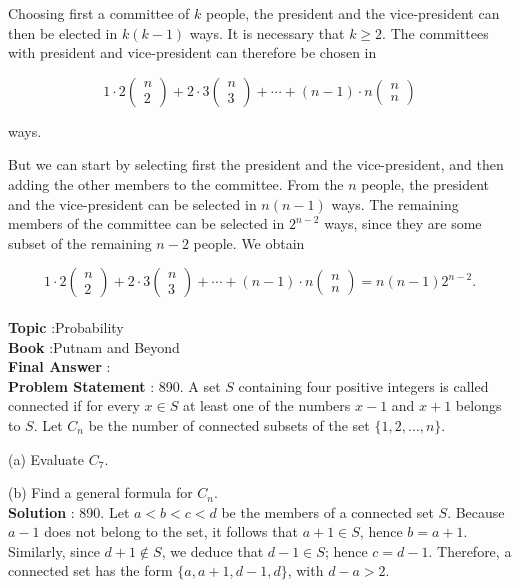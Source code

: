 \documentclass[10pt]{article}
\begin{document}
Choosing first a committee of $k$ people, the president and the vice-president can then be elected in $k(k-1)$ ways. It is necessary that $k \geq 2$. The committees with president and vice-president can therefore be chosen in

$$
1 \cdot 2\left(\begin{array}{l}
n \\
2
\end{array}\right)+2 \cdot 3\left(\begin{array}{l}
n \\
3
\end{array}\right)+\cdots+(n-1) \cdot n\left(\begin{array}{l}
n \\
n
\end{array}\right)
$$

ways.

But we can start by selecting first the president and the vice-president, and then adding the other members to the committee. From the $n$ people, the president and the vice-president can be selected in $n(n-1)$ ways. The remaining members of the committee can be selected in $2^{n-2}$ ways, since they are some subset of the remaining $n-2$ people. We obtain

$$
1 \cdot 2\left(\begin{array}{l}
n \\
2
\end{array}\right)+2 \cdot 3\left(\begin{array}{l}
n \\
3
\end{array}\right)+\cdots+(n-1) \cdot n\left(\begin{array}{l}
n \\
n
\end{array}\right)=n(n-1) 2^{n-2} .
$$
\\
\textbf{Topic} :Probability\\
\textbf{Book} :Putnam and Beyond\\
\textbf{Final Answer} :\\


\textbf{Problem Statement} :
890. A set $S$ containing four positive integers is called connected if for every $x \in S$ at least one of the numbers $x-1$ and $x+1$ belongs to $S$. Let $C_{n}$ be the number of connected subsets of the set $\{1,2, \ldots, n\}$.

(a) Evaluate $C_{7}$.

(b) Find a general formula for $C_{n}$.
\\
\textbf{Solution} :
890. Let $a<b<c<d$ be the members of a connected set $S$. Because $a-1$ does not belong to the set, it follows that $a+1 \in S$, hence $b=a+1$. Similarly, since $d+1 \notin S$, we deduce that $d-1 \in S$; hence $c=d-1$. Therefore, a connected set has the form $\{a, a+1, d-1, d\}$, with $d-a>2$.
\end{document}
